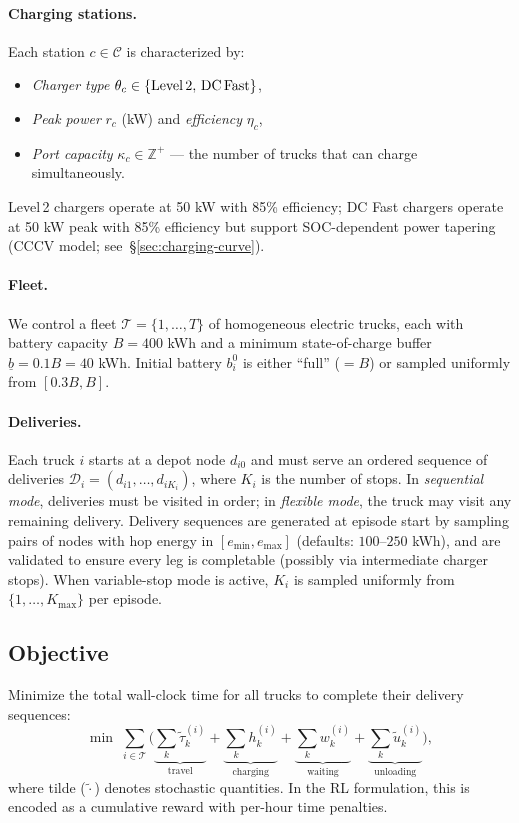 \documentclass[11pt]{article}
\begin{document}
\paragraph{Charging stations.}
Each station $c\in\mathcal{C}$ is characterized by:
\begin{itemize}[nosep]
    \item \emph{Charger type} $\theta_c\in\{\text{Level\,2},\,\text{DC\,Fast}\}$,
    \item \emph{Peak power} $r_c$ (kW) and \emph{efficiency} $\eta_c$,
    \item \emph{Port capacity} $\kappa_c\in\mathbb{Z}^{+}$ --- the number of trucks that can charge simultaneously.
\end{itemize}
Level\,2 chargers operate at 50 kW with 85\% efficiency; DC Fast chargers operate at 50 kW peak with 85\% efficiency but support SOC-dependent power tapering (CCCV model; see~\S\ref{sec:charging-curve}).

\paragraph{Fleet.}
We control a fleet $\mathcal{T}=\{1,\dots,T\}$ of homogeneous electric trucks, each with battery capacity $B=400$ kWh and a minimum state-of-charge buffer $\underline{b}=0.1B=40$ kWh. Initial battery $b_i^0$ is either ``full'' ($=B$) or sampled uniformly from $[0.3B,B]$.

\paragraph{Deliveries.}
Each truck $i$ starts at a depot node $d_{i0}$ and must serve an ordered sequence of deliveries $\mathcal{D}_i = (d_{i1},\dots,d_{iK_i})$, where $K_i$ is the number of stops. In \emph{sequential mode}, deliveries must be visited in order; in \emph{flexible mode}, the truck may visit any remaining delivery. Delivery sequences are generated at episode start by sampling pairs of nodes with hop energy in $[e_{\min},e_{\max}]$ (defaults: $100$--$250$ kWh), and are validated to ensure every leg is completable (possibly via intermediate charger stops). When variable-stop mode is active, $K_i$ is sampled uniformly from $\{1,\dots,K_{\max}\}$ per episode.

\subsection{Objective}

Minimize the total wall-clock time for all trucks to complete their delivery sequences:
\[
\min \; \sum_{i \in \mathcal{T}} \Big( \underbrace{\sum_{k} \tilde{\tau}_{k}^{(i)}}_{\text{travel}} + \underbrace{\sum_{k} h_{k}^{(i)}}_{\text{charging}} + \underbrace{\sum_{k} w_{k}^{(i)}}_{\text{waiting}} + \underbrace{\sum_{k} \tilde{u}_{k}^{(i)}}_{\text{unloading}} \Big),
\]
where tilde ($\tilde{\cdot}$) denotes stochastic quantities. In the RL formulation, this is encoded as a cumulative reward with per-hour time penalties.
\end{document}
